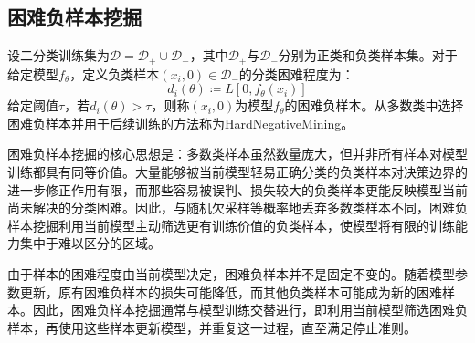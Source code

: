\subsection{困难负样本挖掘}
\begin{definition}
	设二分类训练集为$\mathcal{D}=\mathcal{D}_{+}\cup\mathcal{D}_{-}$，其中$\mathcal{D}_{+}$与$\mathcal{D}_{-}$分别为正类和负类样本集。对于给定模型$f_{\theta}$，定义负类样本$(x_i,0)\in\mathcal{D}_{-}$的分类困难程度为：
	\begin{equation*}
		d_i(\theta)\coloneq L[0,f_{\theta}(x_i)]
	\end{equation*}
	给定阈值$\tau$，若$d_i(\theta)>\tau$，则称$(x_i,0)$为模型$f_{\theta}$的困难负样本。从多数类中选择困难负样本并用于后续训练的方法称为\gls{HardNegativeMining}。
\end{definition}
困难负样本挖掘的核心思想是：多数类样本虽然数量庞大，但并非所有样本对模型训练都具有同等价值。大量能够被当前模型轻易正确分类的负类样本对决策边界的进一步修正作用有限，而那些容易被误判、损失较大的负类样本更能反映模型当前尚未解决的分类困难。因此，与随机欠采样等概率地丢弃多数类样本不同，困难负样本挖掘利用当前模型主动筛选更有训练价值的负类样本，使模型将有限的训练能力集中于难以区分的区域。\par
由于样本的困难程度由当前模型决定，困难负样本并不是固定不变的。随着模型参数更新，原有困难负样本的损失可能降低，而其他负类样本可能成为新的困难样本。因此，困难负样本挖掘通常与模型训练交替进行，即利用当前模型筛选困难负样本，再使用这些样本更新模型，并重复这一过程，直至满足停止准则。
